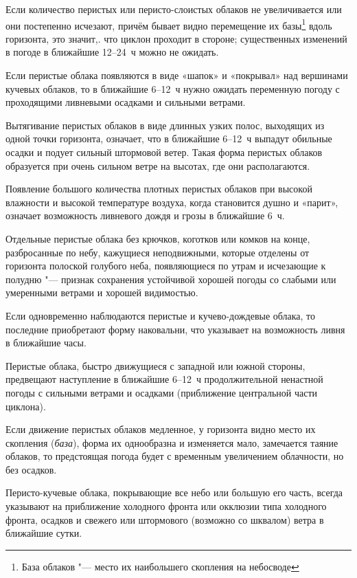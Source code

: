  Если количество перистых или перисто-слоистых облаков не
увеличивается или они постепенно исчезают, причём бывает видно
перемещение их базы\footnote{База облаков "--- место их наибольшего
  скопления на небосводе} вдоль горизонта, это значит,. что циклон
проходит в стороне; существенных изменений в погоде в ближайшие
12--24~ч можно не ожидать.

 Если перистые облака появляются в виде «шапок» и «покрывал» над
вершинами кучевых облаков, то в ближайшие 6--12~ч нужно ожидать
переменную погоду с проходящими ливневыми осадками и сильными ветрами.

 Вытягивание перистых облаков в виде длинных узких полос, выходящих
из одной точки горизонта, означает, что в ближайшие 6--12~ч выпадут
обильные осадки и подует сильный штормовой ветер. Такая форма перистых
облаков образуется при очень сильном ветре на высотах, где они
располагаются.

 Появление большого количества плотных перистых облаков при
высокой влажности и высокой температуре воздуха, когда становится
душно и «парит», означает возможность ливневого дождя и грозы в
ближайшие 6~ч.

 Отдельные перистые облака без крючков, коготков или комков на
конце, разбросанные по небу, кажущиеся неподвижными, которые отделены
от горизонта полоской голубого неба, появляющиеся по утрам и
исчезающие к полудню "--- признак сохранения устойчивой хорошей погоды
со слабыми или умеренными ветрами и хорошей видимостью.

 Если одновременно наблюдаются перистые и кучево-дождевые
облака, то последние приобретают форму наковальни, что указывает на
возможность ливня в ближайшие часы.

 Перистые облака, быстро движущиеся с западной или южной
стороны, предвещают наступление в ближайшие 6--12~ч продолжительной
ненастной погоды с сильными ветрами и осадками (приближение
центральной части циклона).

 Если движение перистых облаков медленное, у горизонта видно
место их скопления (\textit{база}), форма их однообразна и изменяется мало,
замечается таяние облаков, то предстоящая погода будет с временным
увеличением облачности, но без осадков.

 Перисто-кучевые облака, покрывающие все небо или большую его
часть, всегда указывают на приближение холодного фронта или окклюзии
типа холодного фронта, осадков и свежего или штормового (возможно со
шквалом) ветра в ближайшие сутки.


